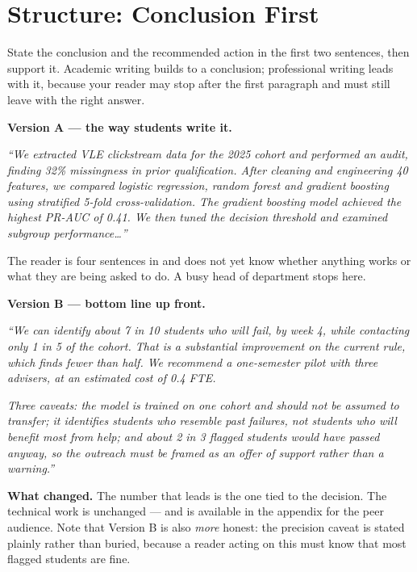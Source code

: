 \section{Structure: Conclusion First}

\begin{definitionbox}
State the conclusion and the recommended action in the first two sentences, then
support it. Academic writing builds to a conclusion; professional writing leads with
it, because your reader may stop after the first paragraph and must still leave with
the right answer.
\end{definitionbox}

\begin{worked}
\textbf{Version A --- the way students write it.}

\emph{``We extracted VLE clickstream data for the 2025 cohort and performed an
audit, finding 32\% missingness in prior qualification. After cleaning and
engineering 40 features, we compared logistic regression, random forest and
gradient boosting using stratified 5-fold cross-validation. The gradient boosting
model achieved the highest PR-AUC of 0.41. We then tuned the decision threshold and
examined subgroup performance\dots''}

\smallskip
The reader is four sentences in and does not yet know whether anything works or what
they are being asked to do. A busy head of department stops here.

\smallskip
\textbf{Version B --- bottom line up front.}

\emph{``We can identify about 7 in 10 students who will fail, by week 4, while
contacting only 1 in 5 of the cohort. That is a substantial improvement on the
current rule, which finds fewer than half. We recommend a one-semester pilot with
three advisers, at an estimated cost of 0.4 FTE.}

\emph{Three caveats: the model is trained on one cohort and should not be assumed to
transfer; it identifies students who resemble past failures, not students who will
benefit most from help; and about 2 in 3 flagged students would have passed
anyway, so the outreach must be framed as an offer of support rather than a
warning.''}

\smallskip
\textbf{What changed.} The number that leads is the one tied to the decision. The
technical work is unchanged --- and is available in the appendix for the peer
audience. Note that Version B is also \emph{more} honest: the precision caveat is
stated plainly rather than buried, because a reader acting on this must know that
most flagged students are fine.
\end{worked}


